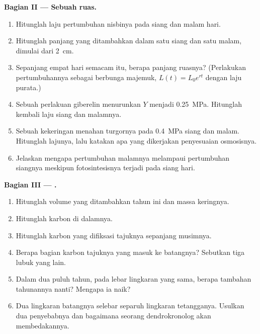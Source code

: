 \begin{problem}
\medskip
\noindent\textbf{Bagian II --- Sebuah ruas.}
\begin{enumerate}[resume]
  \item Hitunglah laju pertumbuhan nisbinya pada siang dan malam hari.
  \item Hitunglah panjang yang ditambahkan dalam satu siang dan satu
        malam, dimulai dari \qty{2}{cm}.
  \item Sepanjang empat hari semacam itu, berapa panjang ruasnya?
        (Perlakukan pertumbuhannya sebagai berbunga majemuk,
        $L(t) = L_0 e^{rt}$ dengan laju purata.)
  \item Sebuah perlakuan giberelin menurunkan $Y$ menjadi
        \qty{0.25}{MPa}. Hitunglah kembali laju siang dan malamnya.
  \item Sebuah kekeringan menahan turgornya pada \qty{0.4}{MPa} siang
        dan malam. Hitunglah lajunya, lalu katakan apa yang dikerjakan
        penyesuaian osmosisnya.
  \item Jelaskan mengapa pertumbuhan malamnya melampaui pertumbuhan
        siangnya meskipun fotosintesisnya terjadi pada siang hari.
\end{enumerate}

\medskip
\noindent\textbf{Bagian III --- .}
\begin{enumerate}[resume]
  \item Hitunglah volume  yang ditambahkan tahun ini dan massa
        keringnya.
  \item Hitunglah karbon di dalamnya.
  \item Hitunglah karbon yang difiksasi tajuknya sepanjang musimnya.
  \item Berapa bagian karbon tajuknya yang masuk ke  batangnya?
        Sebutkan tiga lubuk yang lain.
  \item Dalam dua puluh tahun, pada lebar lingkaran yang sama, berapa
        tambahan  tahunannya nanti? Mengapa ia naik?
  \item Dua lingkaran batangnya selebar separuh lingkaran tetangganya.
        Usulkan dua penyebabnya dan bagaimana seorang dendrokronolog
        akan membedakannya.
\end{enumerate}


\end{problem}
